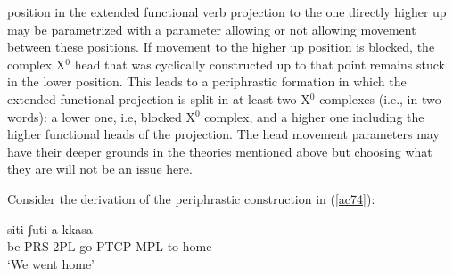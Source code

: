 \documentclass[output=paper]{langscibook}
\begin{document}
position in the extended functional verb projection to the one directly higher up may be parametrized with a parameter allowing or not allowing movement between these positions. If movement to the higher up position is blocked, the complex X$^0$ head that was cyclically constructed up to that point remains stuck in the lower position. This leads to a periphrastic formation in which the extended functional projection is split in at least two X$^0$ complexes (i.e., in two words): a lower one, i.e, blocked X$^0$ complex, and a higher one including the higher functional heads of the projection. The head movement parameters may have their deeper grounds in the theories mentioned above but choosing what they are will not be an issue here.
 
Consider the derivation of the periphrastic construction in (\ref{ac74}):

\ea \label{ac74}\gll siti    ʃuti        a   kkasa\\
   be-PRS-2PL  go-PTCP-MPL  to  home\\
   \glt ‘We went home’
\z
\end{document}
